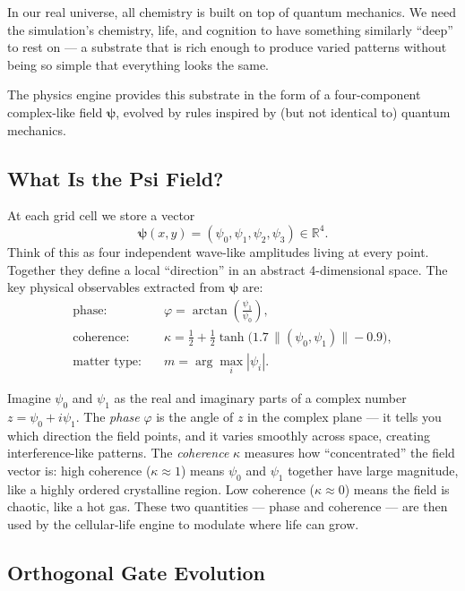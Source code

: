 \documentclass[12pt,a4paper]{article}
\newcommand{\bpsi}{\boldsymbol{\psi}}
\newcommand{\RR}{\mathbb{R}}
\begin{document}
In our real universe, all chemistry is built on top of quantum
mechanics.
We need the simulation's chemistry, life, and cognition to have
something similarly ``deep'' to rest on —
a substrate that is rich enough to produce varied patterns
without being so simple that everything looks the same.

The physics engine provides this substrate in the form of a
four-component complex-like field $\bpsi$,
evolved by rules inspired by
(but not identical to) quantum mechanics.

\subsection{What Is the Psi Field?}

At each grid cell we store a vector
\[
  \bpsi(x,y) = (\psi_0, \psi_1, \psi_2, \psi_3) \in \RR^4.
\]
Think of this as four independent wave-like amplitudes living
at every point.
Together they define a local ``direction'' in an abstract 4-dimensional
space.
The key physical observables extracted from $\bpsi$ are:
\begin{align}
  \text{phase:}& \quad \varphi = \arctan\!\left(\frac{\psi_1}{\psi_0}\right), \\
  \text{coherence:}& \quad \kappa = \frac{1}{2} +
    \frac{1}{2}\tanh\!\bigl(1.7\,\|(\psi_0, \psi_1)\| - 0.9\bigr), \\
  \text{matter type:}& \quad m = \arg\max_i |\psi_i|.
\end{align}

\begin{tcolorbox}[intubox={Intuition for phase and coherence}]
Imagine $\psi_0$ and $\psi_1$ as the real and imaginary parts of a
complex number $z = \psi_0 + i\psi_1$.
The \emph{phase} $\varphi$ is the angle of $z$ in the complex plane —
it tells you which direction the field points, and it varies smoothly
across space, creating interference-like patterns.
The \emph{coherence} $\kappa$ measures how ``concentrated'' the
field vector is: high coherence ($\kappa\approx1$) means
$\psi_0$ and $\psi_1$ together have large magnitude,
like a highly ordered crystalline region.
Low coherence ($\kappa\approx0$) means the field is chaotic,
like a hot gas.
These two quantities — phase and coherence — are then used by the
cellular-life engine to modulate where life can grow.
\end{tcolorbox}

\subsection{Orthogonal Gate Evolution}
\end{document}
